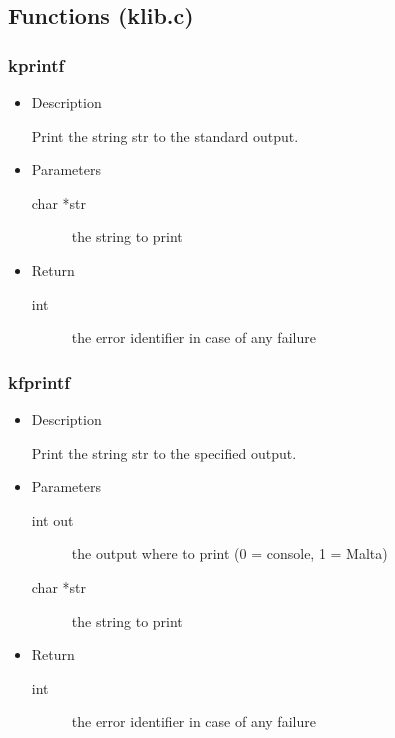 \subsection{Functions (klib.c)}

\subsubsection{kprintf}
\begin{itemize}
  \item{Description}

	 Print the string str to the standard output.
  \item{Parameters}
	 \begin{description}
		\item[char *str] the string to print
	 \end{description}
  \item{Return}
	 \begin{description}
		\item[int] the error identifier in case of any failure
	 \end{description}
\end{itemize}

\subsubsection{kfprintf}
\begin{itemize}
  \item{Description}

	 Print the string str to the specified output.
  \item{Parameters}
	 \begin{description}
		\item[int out] the output where to print (0 = console, 1 = Malta)
		\item[char *str] the string to print
	 \end{description}
  \item{Return}
	 \begin{description}
		\item[int] the error identifier in case of any failure
	 \end{description}
\end{itemize}

